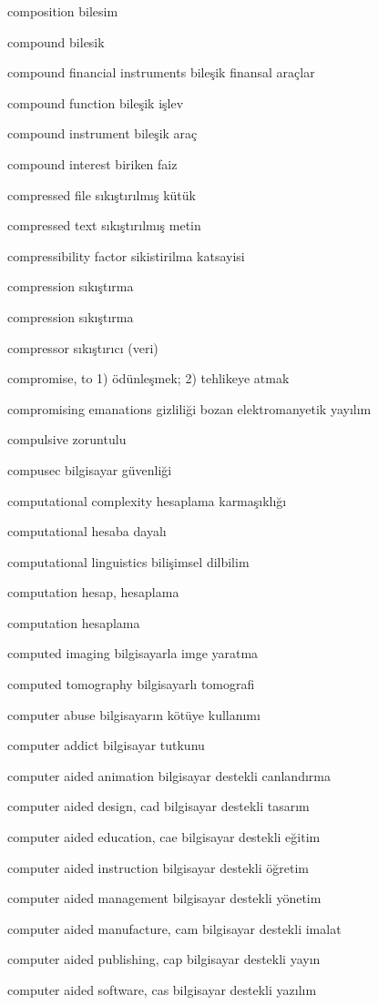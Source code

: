 \documentclass[12pt,fleqn]{article}\usepackage{../../common}
\begin{document}
composition bilesim

compound bilesik

compound financial instruments bileşik finansal araçlar

compound function bileşik işlev

compound instrument bileşik araç

compound interest biriken faiz

compressed file sıkıştırılmış kütük

compressed text sıkıştırılmış metin

compressibility factor sikistirilma katsayisi

compression sıkıştırma

compression sıkıştırma

compressor sıkıştırıcı (veri)

compromise, to 1) ödünleşmek; 2) tehlikeye atmak

compromising emanations gizliliği bozan elektromanyetik yayılım

compulsive zoruntulu

compusec bilgisayar güvenliği

computational complexity hesaplama karmaşıklığı

computational hesaba dayalı

computational linguistics bilişimsel dilbilim

computation hesap, hesaplama

computation hesaplama

computed imaging bilgisayarla imge yaratma

computed tomography bilgisayarlı tomografi

computer abuse bilgisayarın kötüye kullanımı

computer addict bilgisayar tutkunu

computer aided animation bilgisayar destekli canlandırma

computer aided design, cad bilgisayar destekli tasarım

computer aided education, cae bilgisayar destekli eğitim

computer aided instruction bilgisayar destekli öğretim

computer aided management bilgisayar destekli yönetim

computer aided manufacture, cam bilgisayar destekli imalat

computer aided publishing, cap bilgisayar destekli yayın

computer aided software, cas bilgisayar destekli yazılım
\end{document}
